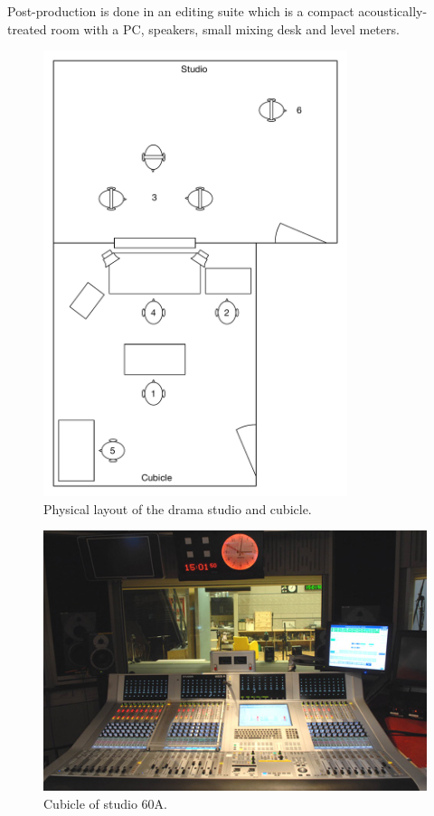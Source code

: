 Post-production is done in an editing suite which is a compact acoustically-treated room with a PC, speakers, small
mixing desk and level meters.

\begin{figure}[ht]
  \centering
  \includegraphics[width=3.5in]{figs/drama-layout.pdf}
  \caption{Physical layout of the drama studio and cubicle.}
  \label{fig:drama-layout}
\end{figure}

\begin{figure}[ht]
  \centering
  \includegraphics[width=\columnwidth]{figs/60a.jpg}
  \caption{Cubicle of studio 60A.}
  \label{fig:drama-studio}
\end{figure}

